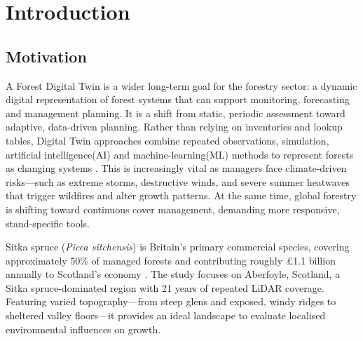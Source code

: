 \documentclass[11pt,a4paper]{report}
\begin{document}
\newcommand{\fc}[1]{\textcolor{red}{[FactC: #1]}} 
\newcommand{\ct}[1]{\textcolor{orange}{[CITE: #1]}} 
\newcommand{\app}[1]{\textcolor{blue}{[APP: #1]}} 
\newcommand{\sr}[1]{\textcolor{teal}{[Sreword: #1]}}
\chapter{Introduction}
\section{Motivation}
A Forest Digital Twin is a wider long-term goal for the forestry sector: a dynamic digital representation of forest systems that can support monitoring, forecasting and management planning. It is a shift from static, periodic assessment toward adaptive, data-driven planning. Rather than relying on inventories and lookup tables, Digital Twin approaches combine repeated observations, simulation, artificial intelligence(AI) and machine-learning(ML) methods to represent forests as changing systems \cite{baskent2026Review_C1_SS}. This is increasingly vital as managers face climate-driven risks—such as extreme storms, destructive winds, and severe summer heatwaves that trigger wildfires and alter growth patterns. At the same time, global forestry is shifting toward continuous cover management, demanding more responsive, stand-specific tools.\cite{ForestResearch2009Evidence_C1_SS}

Sitka spruce (\textit{Picea sitchensis}) is Britain's primary commercial species, covering approximately 50\% of managed forests \cite{ForestResearch2026Sitka_C1_SS} and contributing roughly \pounds1.1 billion annually to Scotland's economy \cite{ScottishForestry2026Future_C1_SS, mason2011Sitka_C1_SS}. The study focuses on Aberfoyle, Scotland, a Sitka spruce-dominated region with 21 years of repeated LiDAR coverage. Featuring varied topography—from steep glens and exposed, windy ridges to sheltered valley floors—it provides an ideal landscape to evaluate localised environmental influences on growth.
\end{document}

